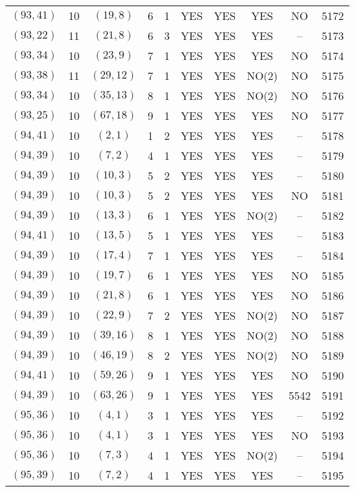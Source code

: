 \begin{longtable}{|c|c|c|c|c|c|c|c|c|c|}
$(93, 41)$ & 10 & $(19, 8)$ & 6 & 1 & YES & YES & YES & NO & 5172\\
$(93, 22)$ & 11 & $(21, 8)$ & 6 & 3 & YES & YES & YES & -- & 5173\\
$(93, 34)$ & 10 & $(23, 9)$ & 7 & 1 & YES & YES & YES & NO & 5174\\
$(93, 38)$ & 11 & $(29, 12)$ & 7 & 1 & YES & YES & NO(2) & NO & 5175\\
$(93, 34)$ & 10 & $(35, 13)$ & 8 & 1 & YES & YES & NO(2) & NO & 5176\\
$(93, 25)$ & 10 & $(67, 18)$ & 9 & 1 & YES & YES & YES & NO & 5177\\
$(94, 41)$ & 10 & $(2, 1)$ & 1 & 2 & YES & YES & YES & -- & 5178\\
$(94, 39)$ & 10 & $(7, 2)$ & 4 & 1 & YES & YES & YES & -- & 5179\\
$(94, 39)$ & 10 & $(10, 3)$ & 5 & 2 & YES & YES & YES & -- & 5180\\
$(94, 39)$ & 10 & $(10, 3)$ & 5 & 2 & YES & YES & YES & NO & 5181\\
$(94, 39)$ & 10 & $(13, 3)$ & 6 & 1 & YES & YES & NO(2) & -- & 5182\\
$(94, 41)$ & 10 & $(13, 5)$ & 5 & 1 & YES & YES & YES & -- & 5183\\
$(94, 39)$ & 10 & $(17, 4)$ & 7 & 1 & YES & YES & YES & -- & 5184\\
$(94, 39)$ & 10 & $(19, 7)$ & 6 & 1 & YES & YES & YES & NO & 5185\\
$(94, 39)$ & 10 & $(21, 8)$ & 6 & 1 & YES & YES & YES & NO & 5186\\
$(94, 39)$ & 10 & $(22, 9)$ & 7 & 2 & YES & YES & NO(2) & NO & 5187\\
$(94, 39)$ & 10 & $(39, 16)$ & 8 & 1 & YES & YES & NO(2) & NO & 5188\\
$(94, 39)$ & 10 & $(46, 19)$ & 8 & 2 & YES & YES & NO(2) & NO & 5189\\
$(94, 41)$ & 10 & $(59, 26)$ & 9 & 1 & YES & YES & YES & NO & 5190\\
$(94, 39)$ & 10 & $(63, 26)$ & 9 & 1 & YES & YES & YES & 5542 & 5191\\
$(95, 36)$ & 10 & $(4, 1)$ & 3 & 1 & YES & YES & YES & -- & 5192\\
$(95, 36)$ & 10 & $(4, 1)$ & 3 & 1 & YES & YES & YES & NO & 5193\\
$(95, 36)$ & 10 & $(7, 3)$ & 4 & 1 & YES & YES & NO(2) & -- & 5194\\
$(95, 39)$ & 10 & $(7, 2)$ & 4 & 1 & YES & YES & YES & -- & 5195\\

\end{longtable}
